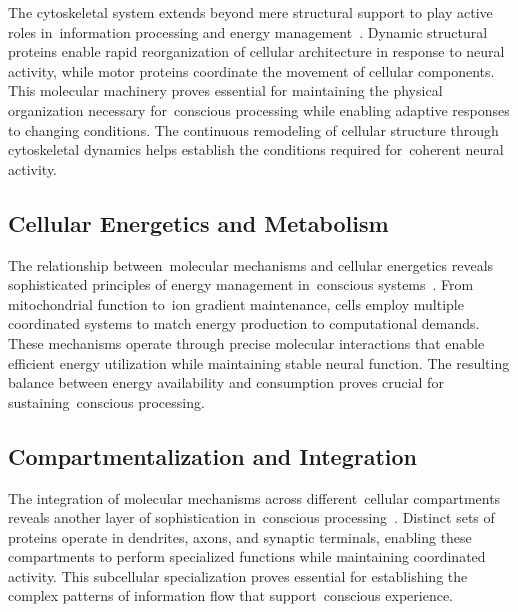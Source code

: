 The cytoskeletal system extends beyond mere structural support to play active roles in~information processing and energy management~\cite{Devor2016, Fletcher2010}. Dynamic structural proteins enable rapid reorganization of cellular architecture in response to neural activity, while motor proteins coordinate the movement of cellular components. This molecular machinery proves essential for maintaining the physical organization necessary for~conscious processing while enabling adaptive responses to changing conditions. The continuous remodeling of cellular structure through cytoskeletal dynamics helps establish the conditions required for~coherent neural activity.

\subsection*{Cellular Energetics and Metabolism~}

The relationship between~molecular mechanisms and cellular energetics reveals sophisticated principles of energy management in~conscious systems~\cite{Sengupta2014, Attwell2001}. From mitochondrial function to~ion gradient maintenance, cells employ multiple coordinated systems to match energy production to computational demands. These mechanisms operate through precise molecular interactions that enable efficient energy utilization while maintaining stable neural function. The resulting balance between energy availability and consumption proves crucial for sustaining~conscious processing.

\subsection*{Compartmentalization and Integration~}

The integration of molecular mechanisms across different~cellular compartments reveals another layer of sophistication in~conscious processing~\cite{Jonas2017, Frauenfelder2009}. Distinct sets of proteins operate in dendrites, axons, and synaptic terminals, enabling these compartments to perform specialized functions while maintaining coordinated activity. This subcellular specialization proves essential for establishing the complex patterns of information flow that support~conscious experience.

